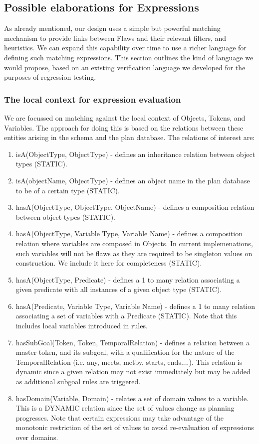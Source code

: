 \documentclass[10pt, letterpaper, oneside]{article}
\begin{document}
\subsection{Possible elaborations for Expressions}
As already mentioned, our design uses a simple but powerful matching mechanism to provide links between Flaws and their relevant filters, and heuristics. We can expand this capability over time to use a richer language for defining such matching expressions. This section outlines the kind of language we would propose, based on an existing verification language we developed for the purposes of regression testing.

\subsubsection{The local context for expression evaluation}
We are focussed on matching against the local context of Objects, Tokens, and Variables. The approach for doing this is based on the relations between these entities arising in the schema and the plan database. The relations of interest are:
\begin{enumerate}
\item isA(ObjectType, ObjectType) - defines an inheritance relation between object types (STATIC).
\item isA(objectName, ObjectType) - defines an object name in the plan database to be of a certain type (STATIC).
\item hasA(ObjectType, ObjectType, ObjectName) - defines a composition relation between object types (STATIC).
\item hasA(ObjectType, Variable Type, Variable Name) - defines a composition relation where variables are composed in Objects. In current implemenations, such variables will not be flaws as they are required to be singleton values on construction. We include it here for completeness (STATIC). 
\item hasA(ObjectType, Predicate) - defines a 1 to many relation associating a given predicate with all instances of a given object type (STATIC).
\item hasA(Predicate, Variable Type, Variable Name) - defines a 1 to many relation associating a set of variables with a Predicate (STATIC). Note that this includes local variables introduced in rules.
\item hasSubGoal(Token, Token, TemporalRelation) - defines a relation between a master token, and its subgoal, with a qualification for the nature of the TemporalRelation (i.e. any, meets, metby, starts, ends....). This relation is dynamic since a given relation may not exist immediately but may be added as additional subgoal rules are triggered.
\item hasDomain(Variable, Domain) - relates a set of domain values to a variable. This is a DYNAMIC relation since the set of values change as planning progresses. Note that certain expressions may take advantage of the monotonic restriction of the set of values to avoid re-evaluation of expressions over domains.
\end{enumerate}
\end{document}
